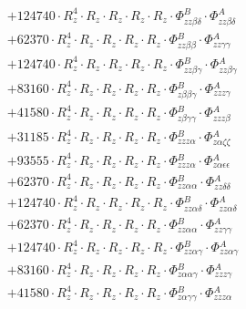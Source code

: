 \documentclass{article}
\begin{document}
\begin{subequations}
\begin{gather}
\begin{array}{c}
 \\[0.2em] 		 + 124740 \cdot R_{z}^{4} \cdot R_{z} \cdot R_{z} \cdot R_{z} \cdot R_{z} \cdot \Phi{}^{B}_{zz\beta{}\delta{}} \cdot \Phi{}^{A}_{zz\beta{}\delta{}} 
 \\[0.2em] 		 + 62370 \cdot R_{z}^{4} \cdot R_{z} \cdot R_{z} \cdot R_{z} \cdot R_{z} \cdot \Phi{}^{B}_{zz\beta{}\beta{}} \cdot \Phi{}^{A}_{zz\gamma{}\gamma{}} 
 \\[0.2em] 		 + 124740 \cdot R_{z}^{4} \cdot R_{z} \cdot R_{z} \cdot R_{z} \cdot R_{z} \cdot \Phi{}^{B}_{zz\beta{}\gamma{}} \cdot \Phi{}^{A}_{zz\beta{}\gamma{}} 
 \\[0.2em] 		 + 83160 \cdot R_{z}^{4} \cdot R_{z} \cdot R_{z} \cdot R_{z} \cdot R_{z} \cdot \Phi{}^{B}_{z\beta{}\beta{}\gamma{}} \cdot \Phi{}^{A}_{zzz\gamma{}} 
 \\[0.2em] 		 + 41580 \cdot R_{z}^{4} \cdot R_{z} \cdot R_{z} \cdot R_{z} \cdot R_{z} \cdot \Phi{}^{B}_{z\beta{}\gamma{}\gamma{}} \cdot \Phi{}^{A}_{zzz\beta{}} 
 \\[0.2em] 		 + 31185 \cdot R_{z}^{4} \cdot R_{z} \cdot R_{z} \cdot R_{z} \cdot R_{z} \cdot \Phi{}^{B}_{zzz\alpha{}} \cdot \Phi{}^{A}_{z\alpha{}\zeta{}\zeta{}} 
 \\[0.2em] 		 + 93555 \cdot R_{z}^{4} \cdot R_{z} \cdot R_{z} \cdot R_{z} \cdot R_{z} \cdot \Phi{}^{B}_{zzz\alpha{}} \cdot \Phi{}^{A}_{z\alpha{}\epsilon{}\epsilon{}} 
 \\[0.2em] 		 + 62370 \cdot R_{z}^{4} \cdot R_{z} \cdot R_{z} \cdot R_{z} \cdot R_{z} \cdot \Phi{}^{B}_{zz\alpha{}\alpha{}} \cdot \Phi{}^{A}_{zz\delta{}\delta{}} 
 \\[0.2em] 		 + 124740 \cdot R_{z}^{4} \cdot R_{z} \cdot R_{z} \cdot R_{z} \cdot R_{z} \cdot \Phi{}^{B}_{zz\alpha{}\delta{}} \cdot \Phi{}^{A}_{zz\alpha{}\delta{}} 
 \\[0.2em] 		 + 62370 \cdot R_{z}^{4} \cdot R_{z} \cdot R_{z} \cdot R_{z} \cdot R_{z} \cdot \Phi{}^{B}_{zz\alpha{}\alpha{}} \cdot \Phi{}^{A}_{zz\gamma{}\gamma{}} 
 \\[0.2em] 		 + 124740 \cdot R_{z}^{4} \cdot R_{z} \cdot R_{z} \cdot R_{z} \cdot R_{z} \cdot \Phi{}^{B}_{zz\alpha{}\gamma{}} \cdot \Phi{}^{A}_{zz\alpha{}\gamma{}} 
 \\[0.2em] 		 + 83160 \cdot R_{z}^{4} \cdot R_{z} \cdot R_{z} \cdot R_{z} \cdot R_{z} \cdot \Phi{}^{B}_{z\alpha{}\alpha{}\gamma{}} \cdot \Phi{}^{A}_{zzz\gamma{}} 
 \\[0.2em] 		 + 41580 \cdot R_{z}^{4} \cdot R_{z} \cdot R_{z} \cdot R_{z} \cdot R_{z} \cdot \Phi{}^{B}_{z\alpha{}\gamma{}\gamma{}} \cdot \Phi{}^{A}_{zzz\alpha{}} 

\end{array}
\end{gather}
\end{subequations}
\end{document}
